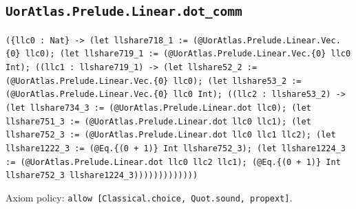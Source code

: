 \documentclass[11pt]{article}
\begin{document}
\subsection*{\texttt{UorAtlas.Prelude.Linear.dot\_comm}}
\noindent\texttt{(\{llc0 : Nat\} -> (let llshare718\_1 := (@UorAtlas.Prelude.Linear.Vec.\{0\} llc0); (let llshare719\_1 := (@UorAtlas.Prelude.Linear.Vec.\{0\} llc0 Int); ((llc1 : llshare719\_1) -> (let llshare52\_2 := (@UorAtlas.Prelude.Linear.Vec.\{0\} llc0); (let llshare53\_2 := (@UorAtlas.Prelude.Linear.Vec.\{0\} llc0 Int); ((llc2 : llshare53\_2) -> (let llshare734\_3 := (@UorAtlas.Prelude.Linear.dot llc0); (let llshare751\_3 := (@UorAtlas.Prelude.Linear.dot llc0 llc1); (let llshare752\_3 := (@UorAtlas.Prelude.Linear.dot llc0 llc1 llc2); (let llshare1222\_3 := (@Eq.\{(0 + 1)\} Int llshare752\_3); (let llshare1224\_3 := (@UorAtlas.Prelude.Linear.dot llc0 llc2 llc1); (@Eq.\{(0 + 1)\} Int llshare752\_3 llshare1224\_3)))))))))))))}\par
\noindent Axiom policy: \texttt{allow [Classical.choice, Quot.sound, propext]}.\par
\end{document}
